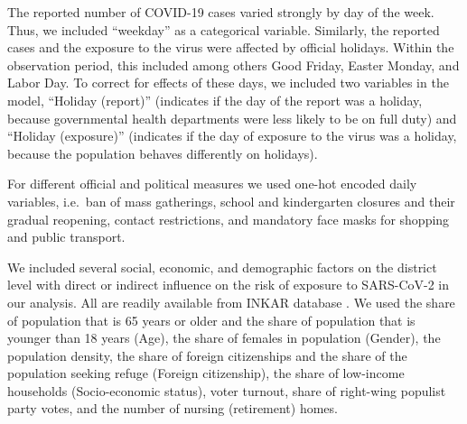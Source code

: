 \documentclass[]{elsarticle} %
\begin{document}
The reported number of COVID-19 cases varied strongly by day of the
week. Thus, we included ``weekday'' as a categorical variable.
Similarly, the reported cases and the exposure to the virus were
affected by official holidays. Within the observation period, this
included among others Good Friday, Easter Monday, and Labor Day. To
correct for effects of these days, we included two variables in the
model, ``Holiday (report)'' (indicates if the day of the report was a
holiday, because governmental health departments were less likely to be
on full duty) and ``Holiday (exposure)'' (indicates if the day of
exposure to the virus was a holiday, because the population behaves
differently on holidays).

For different official and political measures we used one-hot encoded
daily variables, i.e.~ban of mass gatherings, school and kindergarten
closures and their gradual reopening, contact restrictions, and
mandatory face masks for shopping and public transport.

We included several social, economic, and demographic factors on the
district level with direct or indirect influence on the risk of exposure
to SARS-CoV-2 in our analysis. All are readily available from INKAR
database \citep{inkar}. We used the share of population that is 65 years
or older and the share of population that is younger than 18 years
(Age), the share of females in population (Gender), the population
density, the share of foreign citizenships and the share of the
population seeking refuge (Foreign citizenship), the share of low-income
households (Socio-economic status), voter turnout, share of right-wing
populist party votes, and the number of nursing (retirement) homes.
\end{document}
